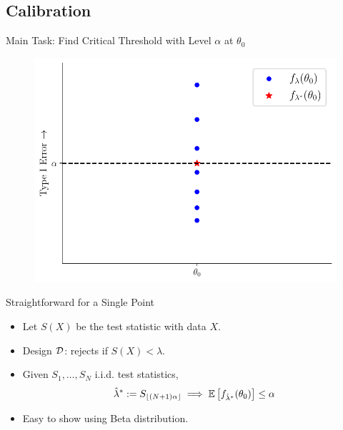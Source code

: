 \subsection{Calibration}
\frame{\tableofcontents[currentsubsection]}

\begin{frame}{Main Task: Find Critical Threshold with Level $\alpha$ at $\theta_0$}
\begin{figure}
    \centering
    \includegraphics[width=0.95\linewidth]{figs/calibration_point_null.pdf}
\end{figure} 
\end{frame}

\begin{frame}{Straightforward for a Single Point}
\begin{itemize}
    \item Let $S(X)$ be the test statistic with data $X$.
    \item Design $\mathcal{D}$: rejects if $S(X) < \lambda$.
    \item Given $S_1,\ldots, S_N$ i.i.d. test statistics,
        \begin{align*}
            \hat{\lambda}^* := S_{\lfloor(N+1) \alpha\rfloor}
            \implies
            \mathbb{E}\left[f_{\hat{\lambda}^*}(\theta_0)\right] \leq \alpha
        \end{align*}
    \item Easy to show using Beta distribution.
\end{itemize} 
\end{frame}

